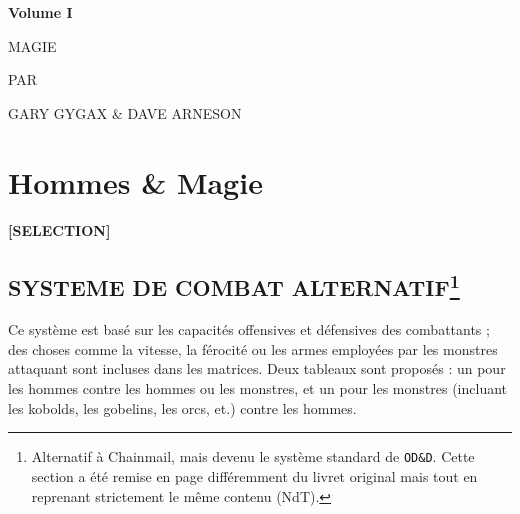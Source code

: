 \newpage
{}\begin{center}
{\Huge {}}{\normalsize \textsuperscript{\sffamily\textregistered}}

\vspace{1.8cm}

{\Large \textbf{Volume I}}

\vspace{1.3cm}

{\Huge {} MAGIE}

\vspace{5cm}

{\large PAR

\vspace{0.1cm}

GARY GYGAX \& DAVE ARNESON}
\end{center}

\newpage

\section*{Hommes \& Magie}

\begin{center}
\textbf{[SELECTION]}
\end{center}

\subsection*{SYSTEME DE COMBAT ALTERNATIF\footnote{Alternatif à Chainmail, mais devenu le système standard de \texttt{OD\&D}. Cette section a été remise en page différemment du livret original mais tout en reprenant strictement le même contenu (NdT).}}

Ce système est basé sur les capacités offensives et défensives des combattants ; des choses comme la vitesse, la férocité ou les armes employées par les monstres attaquant sont incluses dans les matrices. Deux tableaux sont proposés : un pour les hommes contre les hommes ou les monstres, et un pour les monstres (incluant les kobolds, les gobelins, les orcs, et.) contre les hommes.

